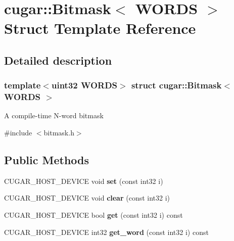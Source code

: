 \hypertarget{structcugar_1_1_bitmask}{}\section{cugar\+:\+:Bitmask$<$ W\+O\+R\+DS $>$ Struct Template Reference}
\label{structcugar_1_1_bitmask}


\subsection{Detailed description}
\subsubsection*{template$<$uint32 W\+O\+R\+DS$>$\newline
struct cugar\+::\+Bitmask$<$ W\+O\+R\+D\+S $>$}

A compile-\/time N-\/word bitmask 

{\ttfamily \#include $<$bitmask.\+h$>$}

\subsection*{Public Methods}
\begin{DoxyCompactItemize}
\item 
\mbox{\label{structcugar_1_1_bitmask_a87982f479ea123f3fc6cd6c0e98ce768}} 
C\+U\+G\+A\+R\+\_\+\+H\+O\+S\+T\+\_\+\+D\+E\+V\+I\+CE void {\bfseries set} (const int32 i)
\item 
\mbox{\label{structcugar_1_1_bitmask_aa9920bec01c92d430df6a67c8c4918fc}} 
C\+U\+G\+A\+R\+\_\+\+H\+O\+S\+T\+\_\+\+D\+E\+V\+I\+CE void {\bfseries clear} (const int32 i)
\item 
\mbox{\label{structcugar_1_1_bitmask_a31fd7baa50f574e02dd4c98e7430aefd}} 
C\+U\+G\+A\+R\+\_\+\+H\+O\+S\+T\+\_\+\+D\+E\+V\+I\+CE bool {\bfseries get} (const int32 i) const
\item 
\mbox{\label{structcugar_1_1_bitmask_ae9d99422884624ffaba8d133b68a5425}} 
C\+U\+G\+A\+R\+\_\+\+H\+O\+S\+T\+\_\+\+D\+E\+V\+I\+CE int32 {\bfseries get\+\_\+word} (const int32 i) const
\end{DoxyCompactItemize}
